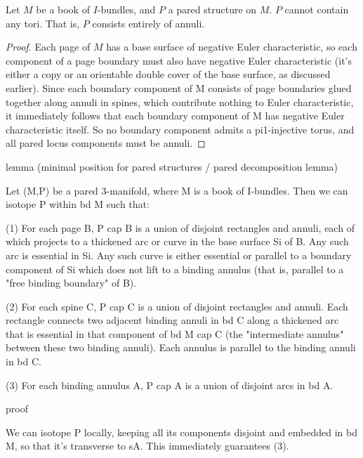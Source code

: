 \begin{prop}

Let $M$ be a book of $I$-bundles, and $P$ a pared structure on $M$. $P$ cannot
contain any tori.  That is, $P$ consists entirely of annuli.

\end{prop}

\begin{proof}

Each page of $M$ has a base surface of negative Euler characteristic, so each
component of a page boundary must also have negative Euler characteristic (it's
either a copy or an orientable double cover of the base surface, as discussed
earlier). Since each boundary component of M consists of page boundaries glued
together along annuli in spines, which contribute nothing to Euler
characteristic, it immediately follows that each boundary component of M has
negative Euler characteristic itself. So no boundary component admits
a pi1-injective torus, and all pared locus components must be annuli.

\end{proof}

lemma (minimal position for pared structures / pared decomposition lemma)

Let (M,P) be a pared 3-manifold, where M is a book of I-bundles. Then we can
isotope P within bd M such that:

(1) For each page B, P cap B is a union of disjoint rectangles and annuli, each
of which projects to a thickened arc or curve in the base surface Si of B. Any
such arc is essential in Si. Any such curve is either essential or parallel to
a boundary component of Si which does not lift to a binding annulus (that is,
parallel to a "free binding boundary" of B).

(2) For each spine C, P cap C is a union of disjoint rectangles and annuli.
Each rectangle connects two adjacent binding annuli in bd C along a thickened
arc that is essential in that component of bd M cap C (the "intermediate
annulus" between these two binding annuli). Each annulus is parallel to the
binding annuli in bd C.

(3) For each binding annulus A, P cap A is a union of disjoint arcs in bd A.

proof

We can isotope P locally, keeping all its components disjoint and embedded in
bd M, so that it's transverse to sA. This immediately guarantees (3).

